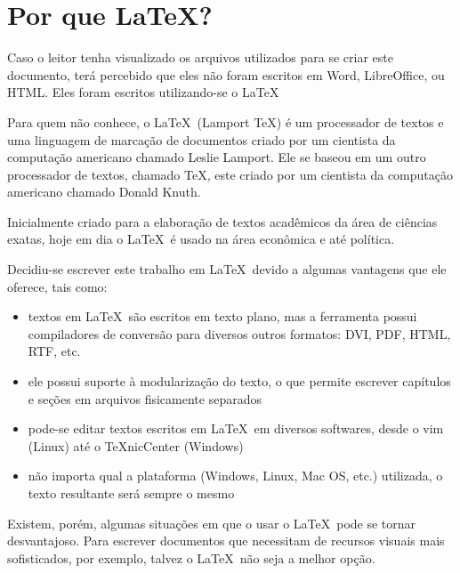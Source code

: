 \section*{Por que \LaTeX?}

Caso o leitor tenha visualizado os arquivos utilizados para se criar este documento, ter\'a percebido que eles n\~ao foram escritos em Word, LibreOffice, ou HTML. Eles foram escritos utilizando-se o \LaTeX\
 
Para quem n\~ao conhece, o \LaTeX\ (Lamport TeX) \'e um processador de textos e uma linguagem de marca\c c\~ao de documentos criado por um cientista da computa\c c\~ao americano chamado Leslie Lamport. Ele se baseou em um outro processador de textos, chamado TeX, este criado por um cientista da computa\c c\~ao americano chamado Donald Knuth. 

Inicialmente criado para a elabora\c c\~ao de textos acad\^emicos da \'area de ci\^encias exatas, hoje em dia o \LaTeX\ \'e usado na \'area econ\^omica e at\'e pol\'itica.

Decidiu-se escrever este trabalho em \LaTeX\ devido a algumas vantagens que ele oferece, tais como:

\begin{itemize}
\item textos em \LaTeX\ s\~ao escritos em texto plano, mas a ferramenta possui compiladores de convers\~ao para diversos outros formatos: DVI, PDF, HTML, RTF, etc.
\item ele possui suporte \`a modulariza\c c\~ao do texto, o que permite escrever cap\'itulos e se\c c\~oes em arquivos fisicamente separados
\item pode-se editar textos escritos em \LaTeX\ em diversos softwares, desde o vim (Linux) at\'e o TeXnicCenter (Windows)
\item n\~ao importa qual a plataforma (Windows, Linux, Mac OS, etc.) utilizada, o texto resultante ser\'a sempre o mesmo
\end{itemize}

Existem, por\'em, algumas situa\c c\~oes em que o usar o \LaTeX\ pode se tornar desvantajoso. Para escrever documentos que necessitam de recursos visuais mais sofisticados, por exemplo, talvez o \LaTeX\ n\~ao seja a melhor op\c c\~ao.
